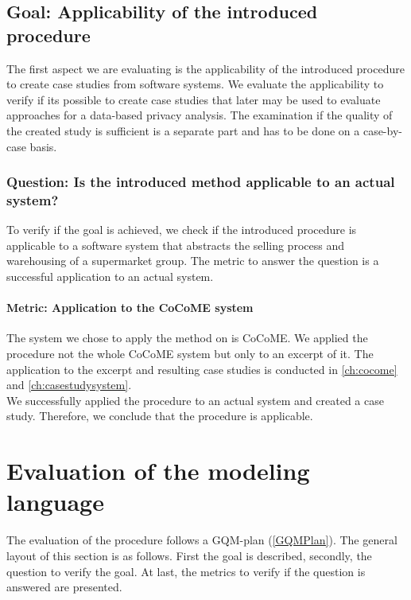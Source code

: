 \subsection{Goal: Applicability of the introduced procedure}
The first aspect we are evaluating is the applicability of the introduced procedure to create case studies from software systems. We evaluate the applicability to verify if its possible to create case studies that later may be used to evaluate approaches for a data-based privacy analysis. The examination if the quality of the created study is sufficient is a separate part and has to be done on a case-by-case basis.  
\subsubsection{Question: Is the introduced method applicable to an actual system?}
To verify if the goal is achieved, we check if the introduced procedure is applicable to a software system that abstracts the selling process and warehousing of a supermarket group. The metric to answer the question is a successful application to an actual system.  
\paragraph{Metric: Application to the CoCoME system}
The system we chose to apply the method on is CoCoME. We applied the procedure not the whole CoCoME system but only to an excerpt of it. The application to the excerpt and resulting case studies is conducted in \autoref{ch:cocome} and \autoref{ch:casestudysystem}.\\ We successfully applied the procedure to an actual system and created a case study. Therefore, we conclude that the procedure is applicable.
\section{Evaluation of the modeling language}
The evaluation of the procedure follows a GQM-plan (\autoref{GQMPlan}). The general layout of this section is as follows. First the goal is described, secondly, the question to verify the goal. At last, the metrics to verify if the question is answered are presented.

